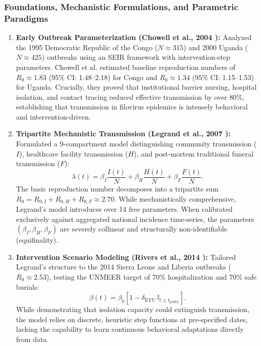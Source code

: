 \documentclass[11pt,a4paper]{article}
\begin{document}
\subsubsection{Foundations, Mechanistic Formulations, and Parametric Paradigms}
\begin{enumerate}
    \item \textbf{Early Outbreak Parameterization (Chowell et al., 2004 \cite{chowell2004basic}):} Analyzed the 1995 Democratic Republic of the Congo ($N \approx 315$) and 2000 Uganda ($N \approx 425$) outbreaks using an SEIR framework with intervention-step parameters. Chowell et al. estimated baseline reproduction numbers of $R_0 \approx 1.83$ (95\% CI: 1.48--2.18) for Congo and $R_0 \approx 1.34$ (95\% CI: 1.15--1.53) for Uganda. Crucially, they proved that institutional barrier nursing, hospital isolation, and contact tracing reduced effective transmission by over $80\%$, establishing that transmission in filovirus epidemics is intensely behavioral and intervention-driven.
    \item \textbf{Tripartite Mechanistic Transmission (Legrand et al., 2007 \cite{legrand2007understanding}):} Formulated a 9-compartment model distinguishing community transmission ($I$), healthcare facility transmission ($H$), and post-mortem traditional funeral transmission ($F$):
    \begin{equation}
        \lambda(t) = \beta_I \frac{I(t)}{N} + \beta_H \frac{H(t)}{N} + \beta_F \frac{F(t)}{N}.
        \label{eq:legrand_force}
    \end{equation}
    The basic reproduction number decomposes into a tripartite sum $R_0 = R_{0,I} + R_{0,H} + R_{0,F} \approx 2.70$. While mechanistically comprehensive, Legrand's model introduces over 14 free parameters. When calibrated exclusively against aggregated national incidence time-series, the parameters $(\beta_I, \beta_H, \beta_F)$ are severely collinear and structurally non-identifiable (equifinality).
    \item \textbf{Intervention Scenario Modeling (Rivers et al., 2014 \cite{rivers2014modeling}):} Tailored Legrand's structure to the 2014 Sierra Leone and Liberia outbreaks ($R_0 \approx 2.53$), testing the UNMEER target of $70\%$ hospitalization and $70\%$ safe burials:
    \begin{equation}
        \beta(t) = \beta_0 \left[1 - \delta_{\text{ETU}} \, \mathbb{I}_{t \ge t_{\text{policy}}}\right].
    \end{equation}
    While demonstrating that isolation capacity could extinguish transmission, the model relies on discrete, heuristic step functions at pre-specified dates, lacking the capability to learn continuous behavioral adaptations directly from data.

\end{enumerate}
\end{document}
